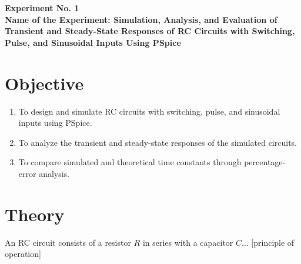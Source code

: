 \documentclass[12pt,a4paper]{article}
\newcommand{\expnumber}{1}   %
\begin{document}



\begin{center}
  {\large\bfseries Experiment No. \expnumber}\\[4pt]
  {\large\bfseries Name of the Experiment: Simulation, Analysis, and
    Evaluation of Transient and Steady-State Responses of RC Circuits
    with Switching, Pulse, and Sinusoidal Inputs Using PSpice}
\end{center}
\vspace{6pt}

\section{Objective}
\begin{enumerate}[label=\roman*.]
  \item To design and simulate RC circuits with switching, pulse, and
        sinusoidal inputs using PSpice.
  \item To analyze the transient and steady-state responses of the
        simulated circuits.
  \item To compare simulated and theoretical time constants through
        percentage-error analysis.
\end{enumerate}

\section{Theory}
An RC circuit consists of a resistor $R$ in series with a capacitor
$C$... [principle of operation]
\end{document}
